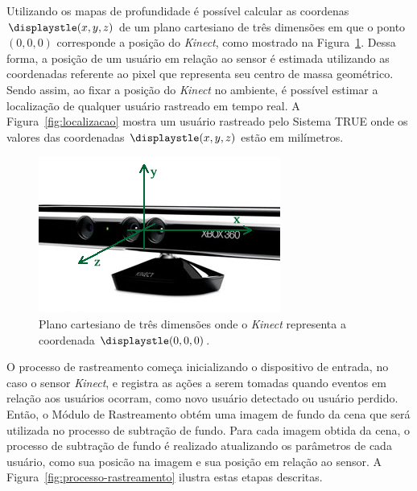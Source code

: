	Utilizando os mapas de profundidade é possível calcular as coordenas $\displaystle (x,y,z)$ de um plano cartesiano de três dimensões em que o ponto $\displaystyle (0, 0, 0)$ corresponde a posição do \textit{Kinect}, como mostrado na Figura~\ref{fig:kinect-coordenadas}. Dessa forma, a posição de um usuário em relação ao sensor é estimada utilizando as coordenadas referente ao pixel que representa seu centro de massa geométrico. Sendo assim, ao fixar a posição do \textit{Kinect} no ambiente, é possível estimar a localização de qualquer usuário rastreado em tempo real. A Figura~\ref{fig:localizacao} mostra um usuário rastreado pelo Sistema TRUE onde os valores das coordenadas $\displaystle (x,y,z)$ estão em milímetros.

	\begin{figure}[htb]
		\begin{center}
			\includegraphics[scale=0.6]{figuras/4.ProblemaEProposta/kinect-coodenadas.png}
		\end{center}
		\caption{Plano cartesiano de três dimensões onde o \textit{Kinect} representa a coordenada $\displaystle (0,0,0)$.}
		\label{fig:kinect-coordenadas}
	\end{figure}



	O processo de rastreamento começa inicializando o dispositivo de entrada, no caso o sensor \textit{Kinect}, e registra as ações a serem tomadas quando eventos em relação aos usuários ocorram, como novo usuário detectado ou usuário perdido. Então, o Módulo de Rastreamento obtém uma imagem de fundo da cena que será utilizada no processo de subtração de fundo. Para cada imagem obtida da cena, o processo de subtração de fundo é realizado atualizando os parâmetros de cada usuário, como sua posicão na imagem e sua posição em relação ao sensor. A Figura~\ref{fig:processo-rastreamento} ilustra estas etapas descritas.

